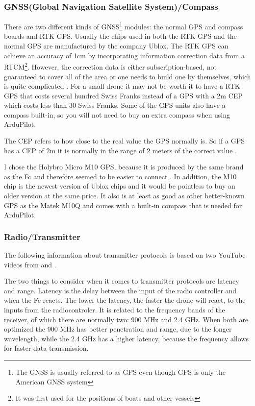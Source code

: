 \documentclass[svgnames]{article}
\begin{document}
	\subsubsection{GNSS(Global Navigation Satellite System)/Compass}
	There are two different kinds of \gls{GNSS}\footnote{The \gls{GNSS} is usually referred to as \gls{GPS} even though \gls{GPS} is only the American \gls{GNSS} system} modules: the normal \gls{GPS} and compass boards and \gls{RTK} \gls{GPS}. Usually the chips used in both the RTK GPS and the normal GPS are manufactured by the company Ublox. The RTK GPS can achieve an accuracy of 1cm by incorporating information correction data from a \gls{RTCM}\footnote{It was first used for the positions of boats and other vessels}. However, the correction data is either subscription-based, not guaranteed to cover all of the area or one needs to build one by themselves, which is quite complicated \cite{rtkgps}. For a small drone it may not be worth it to have a \gls{RTK} \gls{GPS} that costs several hundred Swiss Franks instead of a \gls{GPS} with a 2m \gls{CEP} which costs less than 30 Swiss Franks. Some of the \gls{GPS} units also have a compass built-in, so you will not need to buy an extra compass when using ArduPilot. 
	\begin{Explanation}
		\item The \gls{CEP} refers to how close to the real value the \gls{GPS} normally is. So if a \gls{GPS} has a \gls{CEP}
		of 2m it is normally in the range of 2 meters of the correct value \cite{CEP}.
	\end{Explanation}
	
	I chose the Holybro Micro M10 \gls{GPS}, because it is produced by the same brand as the Fc and therefore seemed to be easier to connect \cite{holybrom10micro}. In addition, the M10 chip is the newest version of Ublox chips and it would be pointless to buy an older version at the same price. It also is at least as good as other better-known GPS as the Matek M10Q \cite{gpstest} and comes with a built-in compass that is needed for ArduPilot.

	\subsubsection{Radio/Transmitter}
	The following information about transmitter protocols is based on two YouTube videos from \textcite{transprotocols} and \textcite{mlrs}.
	
	The two things to consider when it comes to transmitter protocols are latency and range. Latency is the delay between the input of the radio controller and when the \gls{Fc} reacts. The lower the latency, the faster the drone will react, to the inputs from the radiocontroler. It is related to the frequency bands of the receiver, of which there are normally two: 900 MHz and 2.4 GHz. When both are optimized the 900 MHz has better penetration and range, due to the longer wavelength, while the 2.4 GHz has a higher latency, because the frequency allows for faster data transmission.
\end{document}
